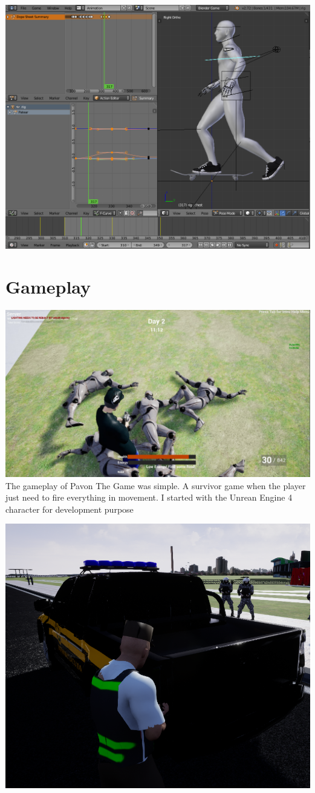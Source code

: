 \documentclass{article}
\begin{document}
  \includegraphics[width=\textwidth]{29.png}


  \section{Gameplay}
  \includegraphics[width=\textwidth]{85.jpg}
  The gameplay of Pavon The Game was simple. A survivor game when the player just need to fire everything in movement. I started with the Unrean Engine 4 character for development purpose
  
  \includegraphics[width=\textwidth]{86.png}
\end{document}
